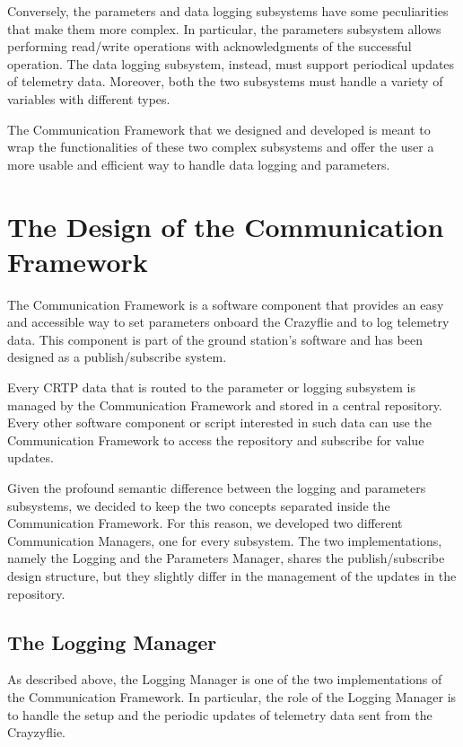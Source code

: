 Conversely, the parameters and data logging subsystems have some peculiarities that make them more complex. 
In particular, the parameters subsystem allows performing read/write operations with acknowledgments of the successful operation.
The data logging subsystem, instead, must support periodical updates of telemetry data.
Moreover, both the two subsystems must handle a variety of variables with different types.

The Communication Framework that we designed and developed is meant to wrap the functionalities of these two complex subsystems and offer the user a more usable and efficient way to handle data logging and parameters.


\section{The Design of the Communication Framework}\label{sec:communication_frameworks_design}

The Communication Framework is a software component that provides an easy and accessible way to set parameters onboard the Crazyflie and to log telemetry data.
This component is part of the ground station's software and has been designed as a publish/subscribe system.

Every CRTP data that is routed to the parameter or logging subsystem is managed by the Communication Framework and stored in a central repository.
Every other software component or script interested in such data can use the Communication Framework to access the repository and subscribe for value updates.

Given the profound semantic difference between the logging and parameters subsystems, we decided to keep the two concepts separated inside the Communication Framework.
For this reason, we developed two different Communication Managers, one for every subsystem. The two implementations, namely the Logging and the Parameters Manager, 
shares the publish/subscribe design structure, but they slightly differ in the management of the updates in the repository.

\subsection{The Logging Manager}\label{subsec:logging_manager}

As described above, the Logging Manager is one of the two implementations of the Communication Framework. 
In particular, the role of the Logging Manager is to handle the setup and the periodic updates of telemetry data sent from the Crayzyflie.

